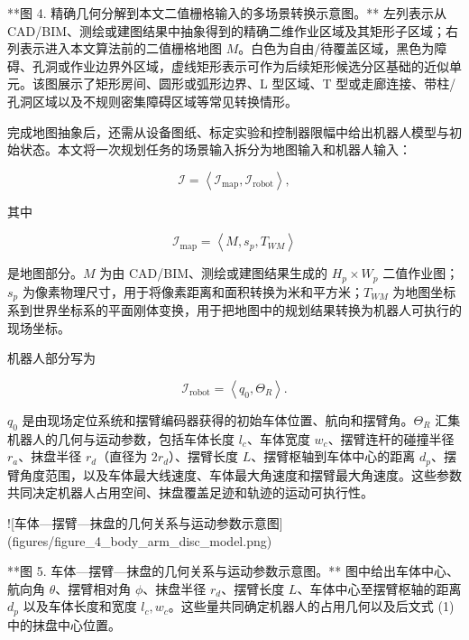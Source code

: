 **图 4. 精确几何分解到本文二值栅格输入的多场景转换示意图。** 左列表示从 CAD/BIM、测绘或建图结果中抽象得到的精确二维作业区域及其矩形子区域；右列表示进入本文算法前的二值栅格地图 $M$。白色为自由/待覆盖区域，黑色为障碍、孔洞或作业边界外区域，虚线矩形表示可作为后续矩形候选分区基础的近似单元。该图展示了矩形房间、圆形或弧形边界、L 型区域、T 型或走廊连接、带柱/孔洞区域以及不规则密集障碍区域等常见转换情形。

  

完成地图抽象后，还需从设备图纸、标定实验和控制器限幅中给出机器人模型与初始状态。本文将一次规划任务的场景输入拆分为地图输入和机器人输入：

  

$$
\mathcal I=
\left\langle
\mathcal I_{\mathrm{map}},\mathcal I_{\mathrm{robot}}
\right\rangle ,
$$

  

其中

  

$$
\mathcal I_{\mathrm{map}}
=\left\langle M,s_p,T_{WM}\right\rangle
$$

  

是地图部分。$M$ 为由 CAD/BIM、测绘或建图结果生成的 $H_p\times W_p$ 二值作业图；$s_p$ 为像素物理尺寸，用于将像素距离和面积转换为米和平方米；$T_{WM}$ 为地图坐标系到世界坐标系的平面刚体变换，用于把地图中的规划结果转换为机器人可执行的现场坐标。

  

机器人部分写为

  

$$
\mathcal I_{\mathrm{robot}}
=\left\langle q_0,\Theta_R\right\rangle .
$$

  

$q_0$ 是由现场定位系统和摆臂编码器获得的初始车体位置、航向和摆臂角。$\Theta_R$ 汇集机器人的几何与运动参数，包括车体长度 $l_c$、车体宽度 $w_c$、摆臂连杆的碰撞半径 $r_a$、抹盘半径 $r_d$（直径为 $2r_d$）、摆臂长度 $L$、摆臂枢轴到车体中心的距离 $d_p$、摆臂角度范围，以及车体最大线速度、车体最大角速度和摆臂最大角速度。这些参数共同决定机器人占用空间、抹盘覆盖足迹和轨迹的运动可执行性。

![车体—摆臂—抹盘的几何关系与运动参数示意图](figures/figure_4_body_arm_disc_model.png)

**图 5. 车体—摆臂—抹盘的几何关系与运动参数示意图。** 图中给出车体中心、航向角 $\theta$、摆臂相对角 $\phi$、抹盘半径 $r_d$、摆臂长度 $L$、车体中心至摆臂枢轴的距离 $d_p$ 以及车体长度和宽度 $l_c,w_c$。这些量共同确定机器人的占用几何以及后文式 (1) 中的抹盘中心位置。

  

